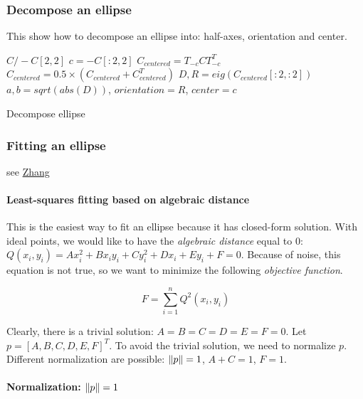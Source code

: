 \subsubsection{Decompose an ellipse}
This show how to decompose an ellipse into: half-axes, orientation and center.
\begin{algorithm}[H]
\DontPrintSemicolon
{}
 $C/-C[2, 2]$ 
 $c = -C[:2, 2]$  
 $C_{centered} = T_{-c} C T_{-c}^T $ 
 $C_{centered} = 0.5\times(C_{centered}+C_{centered}^T)$ 
 $D, R = eig(C_{centered}[:2, :2])$ 
 $a, b = sqrt(abs(D))$, $orientation = R$, $center = c$
\caption{Decompose ellipse}
\end{algorithm}


\subsubsection{Fitting an ellipse}
see \href{https://members.loria.fr/MOBerger/Enseignement/Master2/Documents/ZhangIVC-97-01.pdf}{Zhang}

\paragraph{Least-squares fitting based on algebraic distance}

This is the easiest way to fit an ellipse because it has closed-form solution. With ideal points, we would like to have the \textit{algebraic distance} equal to 0: $Q(x_i, y_i) =  Ax_i^2 + Bx_iy_i + Cy_i^2 + Dx_i + Ey_i + F = 0$.
Because of noise, this equation is not true, so we want to minimize the following \textit{objective function}.

\begin{equation}
    F = \sum_{i=1}^{n} Q^2(x_i, y_i)
\end{equation}

Clearly, there is a trivial solution: $A=B=C=D=E=F=0$. Let $p = [A, B, C, D, E, F]^T$. To avoid the trivial solution, we need to normalize $p$. Different normalization are possible: $\left\lVert p\right\rVert = 1$, $A + C = 1$, $F = 1$.

\paragraph{Normalization: $\left\lVert p\right\rVert=1$}

